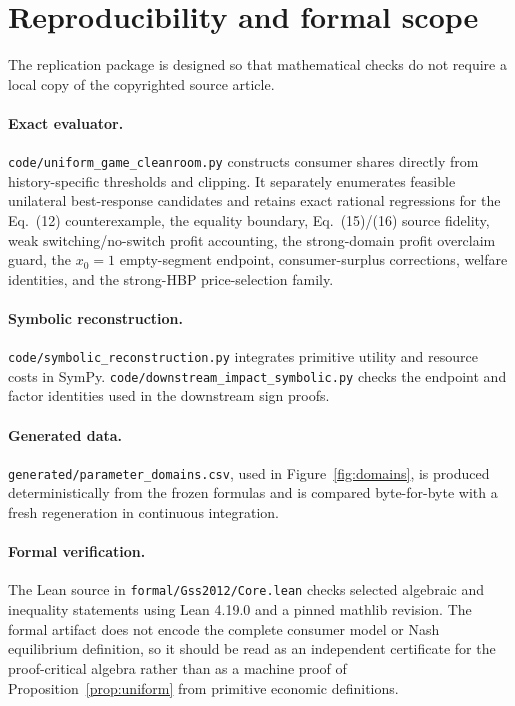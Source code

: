 \section{Reproducibility and formal scope}
\label{app:reproducibility}

The replication package is designed so that mathematical checks do not require a local copy of the copyrighted source article.

\paragraph{Exact evaluator.}
\texttt{code/uniform\_game\_cleanroom.py} constructs consumer shares directly from history-specific thresholds and clipping. It separately enumerates feasible unilateral best-response candidates and retains exact rational regressions for the Eq.~(12) counterexample, the equality boundary, Eq.~(15)/(16) source fidelity, weak switching/no-switch profit accounting, the strong-domain profit overclaim guard, the \(x_0=1\) empty-segment endpoint, consumer-surplus corrections, welfare identities, and the strong-HBP price-selection family.

\paragraph{Symbolic reconstruction.}
\texttt{code/symbolic\_reconstruction.py} integrates primitive utility and resource costs in SymPy. \texttt{code/downstream\_impact\_symbolic.py} checks the endpoint and factor identities used in the downstream sign proofs.

\paragraph{Generated data.}
\texttt{generated/parameter\_domains.csv}, used in Figure~\ref{fig:domains}, is produced deterministically from the frozen formulas and is compared byte-for-byte with a fresh regeneration in continuous integration.

\paragraph{Formal verification.}
The Lean source in \texttt{formal/Gss2012/Core.lean} checks selected algebraic and inequality statements using Lean 4.19.0 and a pinned mathlib revision. The formal artifact does not encode the complete consumer model or Nash equilibrium definition, so it should be read as an independent certificate for the proof-critical algebra rather than as a machine proof of Proposition~\ref{prop:uniform} from primitive economic definitions.

